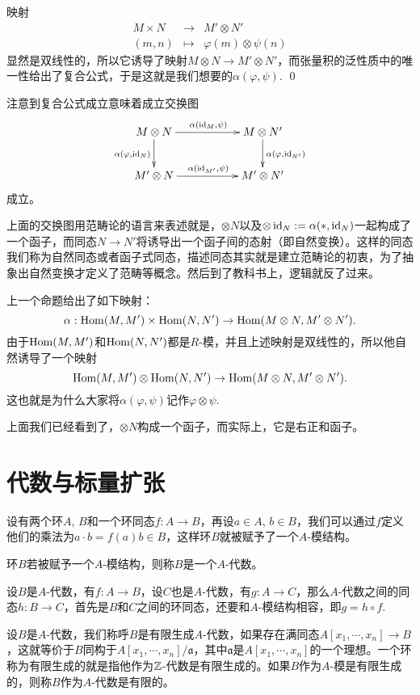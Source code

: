 \proof
	映射
	\[
	\begin{array}{ccc}
		M\times N&\to& M'\otimes N'\\
		(m,n)&\mapsto& \varphi(m)\otimes \psi(n)
	\end{array}
	\]
	显然是双线性的，所以它诱导了映射$M\otimes N\to M'\otimes N'$，而张量积的泛性质中的唯一性给出了复合公式，于是这就是我们想要的$\alpha(\varphi,\psi)$.
\qed

注意到复合公式成立意味着成立交换图
\[
\begin{xy}
	\xymatrix
	{
		M\otimes N\ar[rr]^{\alpha(\id_M,\psi)}\ar[d]_{\alpha(\varphi,\id_{N})}&&M\otimes N'\ar[d]^{\alpha(\varphi,\id_{N'})}\\
		M'\otimes N\ar[rr]^{\alpha(\id_{M'},\psi)}&&M'\otimes N'
	}
\end{xy}
\]
成立。

上面的交换图用范畴论的语言来表述就是，$\otimes N$以及$\otimes \operatorname{id}_N:=\alpha(*,\operatorname{id}_N)$一起构成了一个函子，而同态$N\to N'$将诱导出一个函子间的态射（即自然变换）。这样的同态我们称为自然同态或者函子式同态，描述同态其实就是建立范畴论的初衷，为了抽象出自然变换才定义了范畴等概念。然后到了教科书上，逻辑就反了过来。

\para 上一个命题给出了如下映射：
\[
	\alpha:\operatorname{Hom}(M,M')\times \operatorname{Hom}(N,N')\to \operatorname{Hom}(M\otimes N,M'\otimes N').
\]
由于$\operatorname{Hom}(M,M')$和$\operatorname{Hom}(N,N')$都是$R$-模，并且上述映射是双线性的，所以他自然诱导了一个映射
\[
	\operatorname{Hom}(M,M')\otimes \operatorname{Hom}(N,N')\to \operatorname{Hom}(M\otimes N,M'\otimes N').
\]
这也就是为什么大家将$\alpha(\varphi,\psi)$记作$\varphi\otimes \psi$. 

\para 上面我们已经看到了，$\otimes N$构成一个函子，而实际上，它是右正和函子。

\section{代数与标量扩张}

设有两个环$A$, $B$和一个环同态$f:A\to B$，再设$a\in A$, $b\in B$，我们可以通过$f$定义他们的乘法为$a\cdot b=f(a)b\in B$，这样环$B$就被赋予了一个$A$-模结构。

\para 环$B$若被赋予一个$A$-模结构，则称$B$是一个$A$-代数。

设$B$是$A$-代数，有$f:A\to B$，设$C$也是$A$-代数，有$g:A\to C$，那么$A$-代数之间的同态$h:B\to C$，首先是$B$和$C$之间的环同态，还要和$A$-模结构相容，即$g=h\circ f$.

\para 设$B$是$A$-代数，我们称呼$B$是有限生成$A$-代数，如果存在满同态$A[x_1,\cdots ,x_n]\to B$，这就等价于$B$同构于$A[x_1,\cdots ,x_n]/\mathfrak{a}$，其中$\mathfrak{a}$是$A[x_1,\cdots ,x_n]$的一个理想。一个环称为有限生成的就是指他作为$\mathbb{Z}$-代数是有限生成的。如果$B$作为$A$-模是有限生成的，则称$B$作为$A$-代数是有限的。

